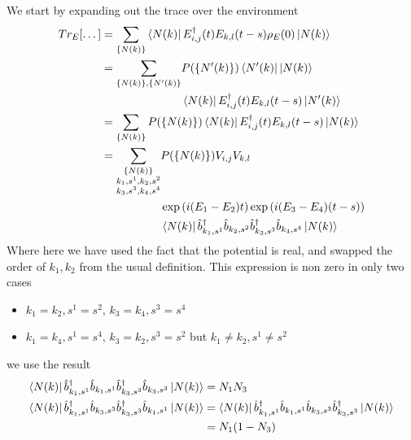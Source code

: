 We start by expanding out the trace
over the environment
\begin{alignat}{2}
    Tr_E[\dots] & = \sum_{\{N(k)\}}
    \bra{N(k)} E^\dagger_{i,j}(t)E_{k,l}(t-s) \rho_E(0) \ket{N(k)}
    \\
                & = \begin{aligned}[t]
        \sum_{\{N(k)\}, \{N'(k)\}} &
        P(\{N'(k)\}) \bra{N'(k)}  \ket{N(k)}                                               \\
                                   & \bra{N(k)} E^\dagger_{i,j}(t)E_{k,l}(t-s) \ket{N'(k)}
    \end{aligned} \\
                & = \sum_{\{N(k)\}}
    P(\{N(k)\}) \bra{N(k)}
    E^\dagger_{i,j}(t)E_{k,l}(t-s) \ket{N(k)} \\
                & = \begin{aligned}[t]
        \sum_{\substack{\{N(k)\}                             \\
        k_1,s^1,k_2,s^2                                      \\
                k_3,s^3,k_4,s^4 }}
         & P(\{N(k)\}) V_{i,j} V_{k,l}                       \\
         & \exp{(i(E_1 - E_2) t)} \exp{(i(E_3 - E_4) (t-s))} \\
         & \bra{N(k)}
        \hat{b}_{k_1,s^1}^\dagger{} \hat{b}_{k_2,s^2}
        \hat{b}_{k_3,s^3}^\dagger{} \hat{b}_{k_4,s^4}
        \ket{N(k)}
    \end{aligned}
\end{alignat}
Where here we have used
the fact that the
potential is real, and
swapped the order of \(k_1, k_2\)
from the usual definition.
This expression is non zero
in only two cases
\begin{itemize}
    \item \(k_1=k_2, s^1=s^2\),
          \(k_3=k_4, s^3=s^4\)
    \item \(k_1=k_4, s^1=s^4\),
          \(k_3=k_2, s^3=s^2\) but
          \(k_1\neq{}k_2, s^1\neq{}s^2\)
\end{itemize}
we use the result
\begin{alignat}{2}
    \bra{N(k)}
    \hat{b}_{k_1,s^1}^\dagger{}
    \hat{b}_{k_1,s^1}
    \hat{b}_{k_3,s^3}^\dagger{}
    \hat{b}_{k_3,s^3}\ket{N(k)} & = N_1 N_3       \\
    \bra{N(k)}
    \hat{b}_{k_1,s^1}^\dagger{}
    \hat{b}_{k_3,s^3}
    \hat{b}_{k_3,s^3}^\dagger{}
    \hat{b}_{k_1,s^1}\ket{N(k)} & = \bra{N(k)}
    \hat{b}_{k_1,s^1}^\dagger{}
    \hat{b}_{k_1,s^1}
    \hat{b}_{k_3,s^3}
    \hat{b}_{k_3,s^3}^\dagger{}
    \ket{N(k)}                                    \\
                                & = N_1 (1 - N_3)
\end{alignat}
